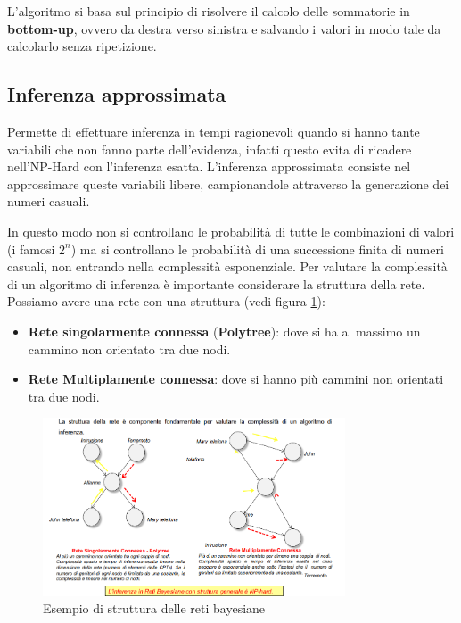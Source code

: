 L'algoritmo si basa sul principio di risolvere il calcolo delle sommatorie in
\textbf{bottom-up}, ovvero da destra verso sinistra e salvando i valori in modo
tale da calcolarlo senza ripetizione.
\subsection{Inferenza approssimata}
Permette di effettuare inferenza in tempi ragionevoli quando si hanno tante
variabili che non fanno parte dell'evidenza, infatti questo evita di ricadere
nell'NP-Hard con l'inferenza esatta. L'inferenza approssimata consiste nel
approssimare queste variabili libere, campionandole attraverso la generazione dei
numeri casuali.

In questo modo non si controllano le probabilità di tutte le combinazioni di valori
(i famosi $2^n$) ma si controllano le probabilità di una successione finita di
numeri casuali, non entrando nella complessità esponenziale.
Per valutare la complessità di un algoritmo di inferenza è importante considerare
la struttura della rete. Possiamo avere una rete con una struttura (vedi figura \ref{fig:struttura_reti}):
\begin{itemize}
    \item \textbf{Rete singolarmente connessa} (\textbf{Polytree}): dove si ha al
          massimo un cammino non orientato tra due nodi.
    \item \textbf{Rete Multiplamente connessa}: dove si hanno più cammini non
          orientati tra due nodi.
\end{itemize}

\begin{figure}[!h]
    \centering
    \includegraphics[width=0.8\textwidth]{img/Reti/struttura_reti_bayesiane.png}
    \caption{Esempio di struttura delle reti bayesiane}
    \label{fig:struttura_reti}
\end{figure}

